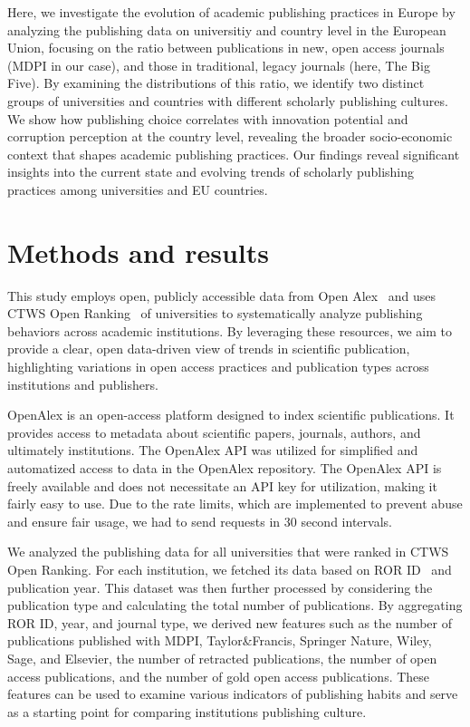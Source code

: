 \documentclass[amsfonts, amssymb, prl, superscriptaddress, notitlepage, twocolumn, nofootinbib]{revtex4-2}
\begin{document}
Here, we investigate the evolution of academic publishing practices in Europe by analyzing the publishing data on universitiy and country level in the European Union, focusing on the ratio between publications in new, open access journals (MDPI in our case), and those in traditional, legacy journals (here, The Big Five). By examining the distributions of this ratio, we identify two distinct groups of universities and countries with different scholarly publishing cultures. We show how publishing choice correlates with innovation potential and corruption perception at the country level, revealing the broader socio-economic context that shapes academic publishing practices. Our findings reveal significant insights into the current state and evolving trends of scholarly publishing practices among universities and EU countries.

\section{Methods and results}
This study employs open, publicly accessible data from Open Alex~\cite{priem2022openalex} and uses CTWS Open Ranking~\cite{cwts2024leiden} of universities to systematically analyze publishing behaviors across academic institutions. By leveraging these resources, we aim to provide a clear, open data-driven view of trends in scientific publication, highlighting variations in open access practices and publication types across institutions and publishers.

OpenAlex is an open-access platform designed to index scientific publications. It provides access to metadata about scientific papers, journals, authors, and ultimately institutions. The OpenAlex API was utilized for simplified and automatized access to data in the OpenAlex repository. The OpenAlex API is freely available and does not necessitate an API key for utilization, making it fairly easy to use. Due to the rate limits, which are implemented to prevent abuse and ensure fair usage, we had to send requests in 30 second intervals. 

We analyzed the publishing data for all universities that were ranked in CTWS Open Ranking. For each institution, we fetched its data based on ROR ID~\cite{ROR} and publication year. This dataset was then further processed by considering the publication type and calculating the total number of publications. By aggregating ROR ID, year, and journal type, we derived new features such as the number of publications published with MDPI, Taylor\&Francis, Springer Nature, Wiley, Sage, and Elsevier, the number of retracted publications, the number of open access publications, and the number of gold open access publications. These features can be used to examine various indicators of publishing habits and serve as a starting point for comparing institutions publishing culture. 
\end{document}
